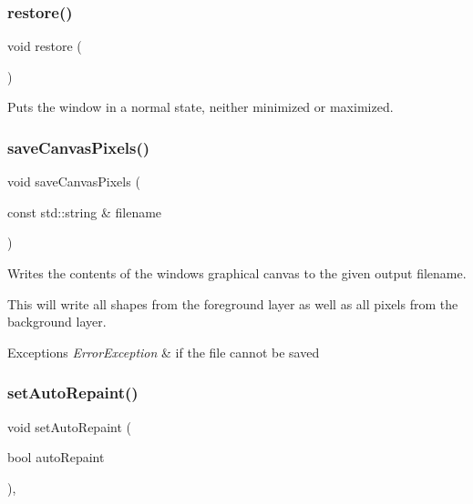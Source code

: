 \subsubsection{\texorpdfstring{restore()}{restore()}}
{\footnotesize\ttfamily void restore (\begin{DoxyParamCaption}{ }\end{DoxyParamCaption})\hspace{0.3cm}{\ttfamily [virtual]}}



Puts the window in a normal state, neither minimized or maximized. 

\mbox{\label{classGWindow_aba99f6a53d9bb0493e7fc3ead6a2e4a3}} 
\subsubsection{\texorpdfstring{save\+Canvas\+Pixels()}{saveCanvasPixels()}}
{\footnotesize\ttfamily void save\+Canvas\+Pixels (\begin{DoxyParamCaption}\item[{const std\+::string \&}]{filename }\end{DoxyParamCaption})\hspace{0.3cm}{\ttfamily [virtual]}}



Writes the contents of the window\textquotesingle{}s graphical canvas to the given output filename. 

This will write all shapes from the foreground layer as well as all pixels from the background layer. 
\begin{DoxyExceptions}{Exceptions}
{\em Error\+Exception} & if the file cannot be saved \\
\hline
\end{DoxyExceptions}
\mbox{\label{classGForwardDrawingSurface_acb65220cc16d17df02a0c08d35b60988}} 
\subsubsection{\texorpdfstring{set\+Auto\+Repaint()}{setAutoRepaint()}}
{\footnotesize\ttfamily void set\+Auto\+Repaint (\begin{DoxyParamCaption}\item[{bool}]{auto\+Repaint }\end{DoxyParamCaption})\hspace{0.3cm}{\ttfamily [override]}, {\ttfamily [inherited]}}

